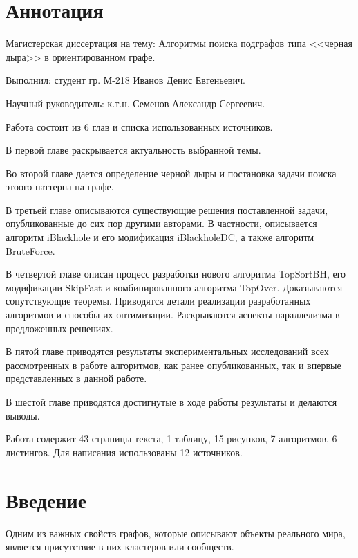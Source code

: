 \documentclass[12pt,a4paper,oneside,openany]{article}
\theoremstyle{definition}
\theoremstyle{lemma}
\theoremstyle{remark}
\begin{document}
\setcounter{tocdepth}{2}
\tableofcontents
\thispagestyle{empty}

\cleardoublepage


\cleardoublepage
\setcounter{page}{3}
\section*{Аннотация}\label{sec:annotation}
Магистерская диссертация на тему: Алгоритмы поиска подграфов типа <<черная дыра>> в ориентированном графе.

Выполнил: студент гр. М-218 Иванов Денис Евгеньевич.

Научный руководитель: к.т.н. Семенов Александр Сергеевич.

Работа состоит из 6 глав и списка использованных источников.

В первой главе раскрывается актуальность выбранной темы.

Во второй главе дается определение черной дыры и постановка задачи поиска этоого паттерна на графе.

В третьей главе описываются существующие решения поставленной задачи, опубликованные до сих пор другими авторами.
В частности, описывается алгоритм iBlackhole и его модификация iBlackholeDC, а также алгоритм BruteForce.

В четвертой главе описан процесс разработки нового алгоритма TopSortBH, его модификации SkipFast и комбинированного
алгоритма TopOver. Доказываются сопутствующие теоремы. Приводятся детали реализации
разработанных алгоритмов и способы их оптимизации. Раскрываются аспекты параллелизма в предложенных решениях.

В пятой главе приводятся результаты экспериментальных исследований всех рассмотренных в работе алгоритмов, как
ранее опубликованных, так и впервые представленных в данной работе.

В шестой главе приводятся достигнутые в ходе работы результаты и делаются выводы.

Работа содержит 43 страницы текста, 1 таблицу, 15 рисунков, 7 алгоритмов, 6 листингов.
Для написания использованы 12 источников.

\cleardoublepage
\section{Введение}\label{sec:otherintro}

Одним из важных свойств графов, которые описывают объекты реального мира,
является присутствие в них кластеров или сообществ.
\end{document}
